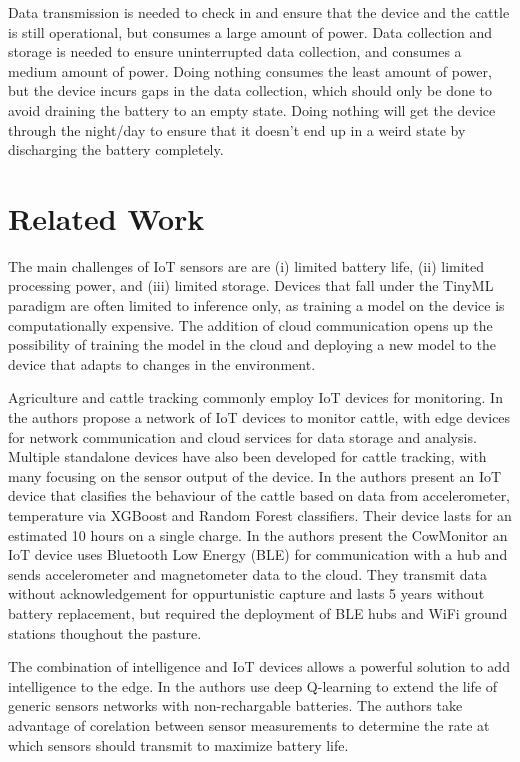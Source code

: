 \documentclass[10pt]{cai}
\begin{document}
Data transmission is needed to check in and ensure that the device and the cattle is still operational, but consumes a large amount of power.
Data collection and storage is needed to ensure uninterrupted data collection, and consumes a medium amount of power.
Doing nothing consumes the least amount of power, but the device incurs gaps in the data collection, which should only be done to avoid draining the battery to an empty state.
Doing nothing will get the device through the night/day to ensure that it doesn't end up in a weird state by discharging the battery completely.

\section{Related Work}
The main challenges of IoT sensors are \cite{chenDeepReinforcementLearning2021} are (i) limited battery life, (ii) limited processing power, and (iii) limited storage.
Devices that fall under the TinyML paradigm are often limited to inference only, as training a model on the device is computationally expensive.
The addition of cloud communication opens up the possibility of training the model in the cloud and deploying a new model to the device that adapts to changes in the environment.

Agriculture and cattle tracking commonly employ IoT devices for monitoring. 
In \cite{yamsaniIoTBasedLivestockMonitoring2024} the authors propose a network of IoT devices to monitor cattle, with edge devices for network communication and cloud services for data storage and analysis.
Multiple standalone devices have also been developed for cattle tracking, with many focusing on the sensor output of the device.
In \cite{duttaMOOnitorIoTBased2022} the authors present an IoT device that clasifies the behaviour of the cattle based on data from accelerometer, temperature via XGBoost and Random Forest classifiers.
Their device lasts for an estimated 10 hours on a single charge.
In \cite{unoldIoTBasedCowHealth2020} the authors present the CowMonitor an IoT device uses Bluetooth Low Energy (BLE) for communication with a hub and sends accelerometer and magnetometer data to the cloud.
They transmit data without acknowledgement for oppurtunistic capture and lasts 5 years without battery replacement, but required the deployment of BLE hubs and WiFi ground stations thoughout the pasture.

The combination of intelligence and IoT devices allows a powerful solution to add intelligence to the edge.
In \cite{hribarUsingDeepQLearning2019} the authors use deep Q-learning to extend the life of generic sensors networks with non-rechargable batteries. 
The authors take advantage of corelation between sensor measurements to determine the rate at which sensors should transmit to maximize battery life.
\end{document}
